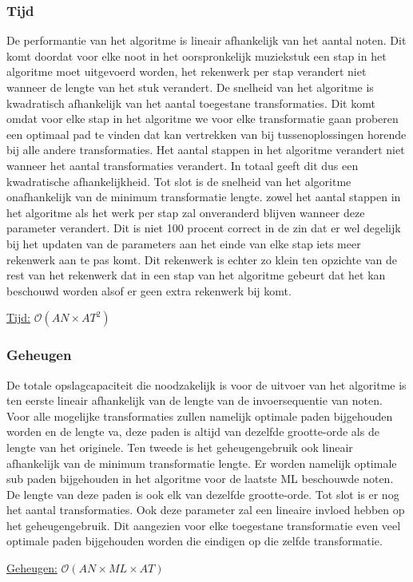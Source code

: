 \subsubsection{Tijd}
De performantie van het algoritme is lineair afhankelijk van het aantal noten. Dit komt doordat voor elke noot in het oorspronkelijk muziekstuk een stap in het algoritme moet uitgevoerd worden, het rekenwerk per stap verandert niet wanneer de lengte van het stuk verandert. De snelheid van het algoritme is kwadratisch afhankelijk van het aantal toegestane transformaties. Dit komt omdat voor elke stap in het algoritme we voor elke transformatie gaan proberen een optimaal pad te vinden dat kan vertrekken van bij tussenoplossingen horende bij alle andere transformaties. Het aantal stappen in het algoritme verandert niet wanneer het aantal transformaties verandert. In totaal geeft dit dus een kwadratische afhankelijkheid. Tot slot is de snelheid van het algoritme onafhankelijk van de minimum transformatie lengte. zowel het aantal stappen in het algoritme als het werk per stap zal onveranderd blijven wanneer deze parameter verandert. Dit is niet 100 procent correct in de zin dat er wel degelijk bij het updaten van de parameters aan het einde van elke stap iets meer rekenwerk aan te pas komt. Dit rekenwerk is echter zo klein ten opzichte van de rest van het rekenwerk dat in een stap van het algoritme gebeurt dat het kan beschouwd worden alsof er geen extra rekenwerk bij komt. 

\begin{center}
\underline{Tijd:} $\mathcal{O}(AN \times AT^2)$
\end{center}

\subsubsection{Geheugen}
De totale opslagcapaciteit die noodzakelijk is voor de uitvoer van het algoritme is ten eerste lineair afhankelijk van de lengte van de invoersequentie van noten. Voor alle mogelijke transformaties zullen namelijk optimale paden bijgehouden worden en de lengte va, deze paden is altijd van dezelfde grootte-orde als de lengte van het originele. Ten tweede is het geheugengebruik ook lineair afhankelijk van de minimum transformatie lengte. Er worden namelijk optimale sub paden bijgehouden in het algoritme voor de laatste ML beschouwde noten. De lengte van deze paden is ook elk van dezelfde grootte-orde. Tot slot is er nog het aantal transformaties. Ook deze parameter zal een lineaire invloed hebben op het geheugengebruik. Dit aangezien voor elke toegestane transformatie even veel optimale paden bijgehouden worden die eindigen op die zelfde transformatie.  

\begin{center}
\underline{Geheugen:} $\mathcal{O}(AN \times ML \times AT)$
\end{center}

